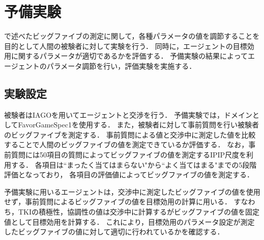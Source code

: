 

\chapter{予備実験}
で述べたビッグファイブの測定に関して，各種パラメータの値を調節することを目的として人間の被験者に対して実験を行う．
同時に，エージェントの目標効用に関するパラメータが適切であるかを評価する．
予備実験の結果によってエージェントのパラメータ調節を行い，評価実験を実施する．

\section{実験設定}
被験者はIAGOを用いてエージェントと交渉を行う．
予備実験では，ドメインとしてFavorGameSpec1を使用する．
また，被験者に対して事前質問を行い被験者のビッグファイブを測定する．
事前質問による値と交渉中に測定した値を比較することで人間のビッグファイブの値を測定できているか評価する．
なお，事前質問には50項目の質問によってビッグファイブの値を測定するIPIP尺度を利用する．
各項目は“まったく当てはまらない"から“よく当てはまる"までの5段階評価となっており，
各項目の評価値によってビッグファイブの値を測定する．

予備実験に用いるエージェントは，交渉中に測定したビッグファイブの値を使用せず，事前質問によるビッグファイブの値を目標効用の計算に用いる．
すなわち，TKIの積極性，協調性の値は交渉中に計算するがビッグファイブの値を固定値として目標効用を計算する．
これにより，目標効用のパラメータ設定が測定したビッグファイブの値に対して適切に行われているかを確認する．

